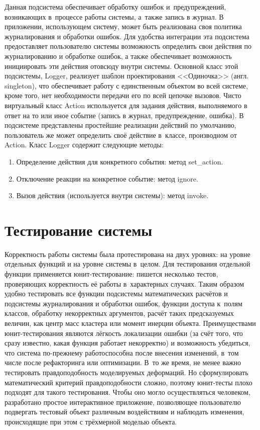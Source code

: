 \documentclass[a4paper, 14pt, titlepage]{extarticle}
\newcommand{\eng}[1]{{\English #1}}
\let\oldsection\section
\renewcommand{\section}{\newpage\oldsection}
\begin{document}
        Данная подсистема обеспечивает обработку ошибок и~предупреждений, возникающих в~процессе
        работы системы, а~также запись в журнал. В приложении, использующем систему, может
        быть реализована своя политика журналирования и обработки ошибок. Для удобства интеграции
        эта подсистема предоставляет пользователю системы возможность определить свои действия по
        журналированию и обработке ошибок, а также обеспечивает возможность инициировать эти действия
        отовсюду внутри системы.
        Основной класс этой подсистемы, Logger, реализует шаблон проектирования <<Одиночка>> (англ.
        \eng{singleton}), что обеспечивает работу с единственным объектом во всей системе,
        кроме того, нет необходимости передачи его по всей цепочке вызовов. Чисто виртуальный класс Action
        используется для задания действия, выполняемого в ответ на то или иное событие (запись в
        журнал, предупреждение, ошибка). В подсистеме представлены простейшие реализации действий по
        умолчанию, пользователь же может определить своё действие в~классе, производном от Action. Класс
        Logger содержит следующие методы:
        \begin{enumerate}
          \item Определение действия для конкретного события: метод set\_action.
          \item Отключение реакции на конкретное событие: метод ignore.
          \item Вызов действия (используется внутри системы): метод invoke.
        \end{enumerate}

  \section{Тестирование системы}

      Корректность работы системы была протестирована на двух уровнях: на уровне отдельных функций и на
      уровне системы в~целом. Для тестирования отдельной функции применяется юнит-тестирование:
      пишется несколько тестов, проверяющих корректность её работы в~характерных случаях. Таким
      образом удобно тестировать все функции подсистемы математических расчётов и подсистемы
      журналирования и обработки ошибок, функции доступа к~полям классов, обработку некорректных
      аргументов, расчёт таких предсказуемых величин, как центр масс кластера или
      момент инерции объекта. Преимуществами юнит-тестирования являются лёгкость локализации ошибки
      (за счёт того, что сразу известно, какая функция работает некорректно) и возможность
      убедиться, что система по-прежнему работоспособна после внесения изменений, в~том числе
      после рефакторинга или оптимизации. В~то же время, не менее важно тестировать правдоподобность
      моделируемых деформаций. Но сформулировать математический критерий правдоподобности сложно,
      поэтому юнит-тесты плохо подходят для такого тестирования. Чтобы оно могло осуществляться
      человеком, разработано простое интерактивное приложение, позволяющее пользователю подвергать
      тестовый объект различным воздействиям и наблюдать изменения, происходящие при этом с
      трёхмерной моделью объекта.
\end{document}
